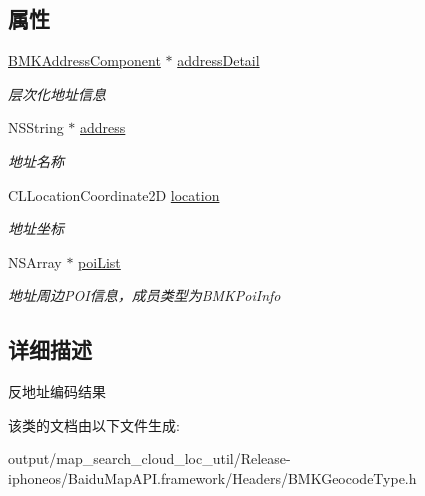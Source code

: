 \subsection*{属性}
\begin{DoxyCompactItemize}
\item 
\hypertarget{interface_b_m_k_reverse_geo_code_result_acde5aee09b57f17a58b7f557e3ad4758}{}\hyperlink{interface_b_m_k_address_component}{B\+M\+K\+Address\+Component} $\ast$ \hyperlink{interface_b_m_k_reverse_geo_code_result_acde5aee09b57f17a58b7f557e3ad4758}{address\+Detail}\label{interface_b_m_k_reverse_geo_code_result_acde5aee09b57f17a58b7f557e3ad4758}

\begin{DoxyCompactList}\small\item\em 层次化地址信息 \end{DoxyCompactList}\item 
\hypertarget{interface_b_m_k_reverse_geo_code_result_a069818e5afe4ee4041d7484d70e1e3bb}{}N\+S\+String $\ast$ \hyperlink{interface_b_m_k_reverse_geo_code_result_a069818e5afe4ee4041d7484d70e1e3bb}{address}\label{interface_b_m_k_reverse_geo_code_result_a069818e5afe4ee4041d7484d70e1e3bb}

\begin{DoxyCompactList}\small\item\em 地址名称 \end{DoxyCompactList}\item 
\hypertarget{interface_b_m_k_reverse_geo_code_result_ae7afa6e87f1c8fc31a17dbccf15588da}{}C\+L\+Location\+Coordinate2\+D \hyperlink{interface_b_m_k_reverse_geo_code_result_ae7afa6e87f1c8fc31a17dbccf15588da}{location}\label{interface_b_m_k_reverse_geo_code_result_ae7afa6e87f1c8fc31a17dbccf15588da}

\begin{DoxyCompactList}\small\item\em 地址坐标 \end{DoxyCompactList}\item 
\hypertarget{interface_b_m_k_reverse_geo_code_result_a6c9fd2997504cff3b99569f5f89dba20}{}N\+S\+Array $\ast$ \hyperlink{interface_b_m_k_reverse_geo_code_result_a6c9fd2997504cff3b99569f5f89dba20}{poi\+List}\label{interface_b_m_k_reverse_geo_code_result_a6c9fd2997504cff3b99569f5f89dba20}

\begin{DoxyCompactList}\small\item\em 地址周边\+P\+O\+I信息，成员类型为\+B\+M\+K\+Poi\+Info \end{DoxyCompactList}\end{DoxyCompactItemize}


\subsection{详细描述}
反地址编码结果 

该类的文档由以下文件生成\+:\begin{DoxyCompactItemize}
\item 
output/map\+\_\+search\+\_\+cloud\+\_\+loc\+\_\+util/\+Release-\/iphoneos/\+Baidu\+Map\+A\+P\+I.\+framework/\+Headers/B\+M\+K\+Geocode\+Type.\+h\end{DoxyCompactItemize}
